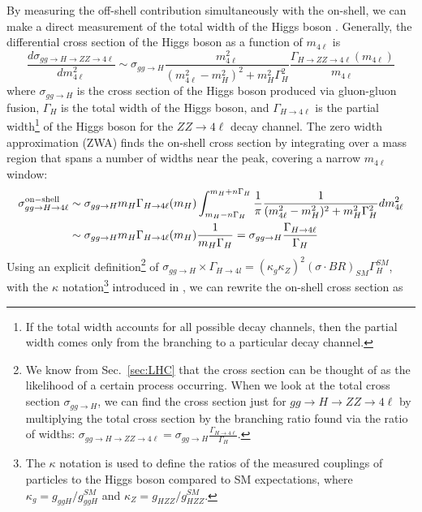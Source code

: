 By measuring the off-shell contribution simultaneously with the on-shell, we can make a direct measurement of the total width of the Higgs boson \cite{CaolaMelnikov:1307.4935}. Generally, the differential cross section of the Higgs boson as a function of $m_{4\ell}$ is 
\begin{equation}
\frac{d\sigma_{gg\rightarrow H\rightarrow ZZ\rightarrow 4\ell}}{dm^2_{4\ell}} \sim \sigma_{gg\rightarrow H} \frac{m_{4\ell}^2}{(m_{4\ell}^2-m_{H}^2)^2+m_H^2\Gamma_{H}^2}\frac{\Gamma_{H\rightarrow ZZ \rightarrow 4\ell}(m_{4\ell})}{m_{4\ell}}
\label{eqn:DiffCrossSection}
\end{equation}
where $\sigma_{gg\rightarrow H}$ is the cross section of the Higgs boson produced via gluon-gluon fusion, $\Gamma_{H}$ is the total width of the Higgs boson, and $\Gamma_{H\rightarrow 4\ell}$ is the partial width\footnote{If the total width accounts for all possible decay channels, then the partial width comes only from the branching to a particular decay channel.} of the Higgs boson for the $ZZ\rightarrow 4\ell$ decay channel. The zero width approximation (ZWA) finds the on-shell cross section by integrating over a mass region that spans a number of widths near the peak, covering a narrow $m_{4\ell}$ window:
\begin{equation}
\begin{split}
\sigma_{gg\rightarrow H\rightarrow 4\ell}^{\rm on-shell} &\sim \sigma_{gg\rightarrow H}m_{H}\Gamma_{H\rightarrow 4\ell}(m_{H})\int_{m_H-n\Gamma_H}^{m_H+n\Gamma_H} \frac{1}{\pi}\frac{1}{(m_{4\ell}^2-m_{H}^2)^2 + m_H^2\Gamma_H^2}dm_{4\ell}^2 \\
&\sim \sigma_{gg\rightarrow H}m_{H}\Gamma_{H\rightarrow 4\ell}(m_{H})\frac{1}{m_H\Gamma_H} = \sigma_{gg\rightarrow H}\frac{\Gamma_{H\rightarrow 4\ell}}{\Gamma_H}
\end{split}
\end{equation}
Using an explicit definition\footnote{We know from Sec.~\ref{sec:LHC} that the cross section can be thought of as the likelihood of a certain process occurring. When we look at the total cross section $\sigma_{gg\rightarrow H}$, we can find the cross section just for $gg \rightarrow H \rightarrow ZZ \rightarrow 4\ell$ by multiplying the total cross section by the branching ratio found via the ratio of widths: $\sigma_{gg\rightarrow H \rightarrow ZZ \rightarrow 4\ell} = \sigma_{gg\rightarrow H} \frac{\Gamma_{H \rightarrow 4\ell}}{\Gamma_{H}}$.} of $\sigma_{gg\rightarrow H}\times\Gamma_{H\rightarrow 4l} = \left(\kappa_g\kappa_Z\right)^2(\sigma\cdot BR)_{SM}\Gamma_{H}^{SM}$, with the $\kappa$ notation\footnote{The $\kappa$ notation is used to define the ratios of the measured couplings of particles to the Higgs boson compared to SM expectations, where $\kappa_g = g_{ggH}/g_{ggH}^{SM}$ and $\kappa_Z = g_{HZZ}/g_{HZZ}^{SM}$.} introduced in \cite{Higgs4lLegacy:2013}, we can rewrite the on-shell cross section as
